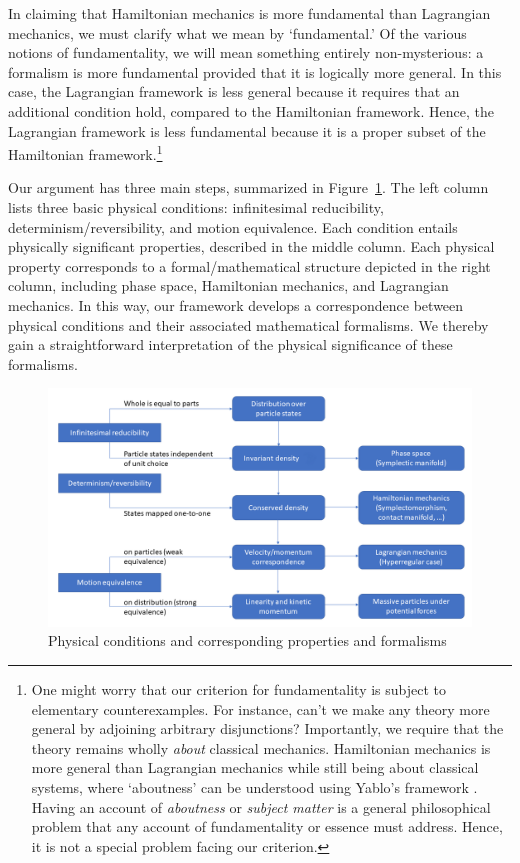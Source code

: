 \documentclass[12pt, english, twoside]{article} %
\begin{document}
In claiming that Hamiltonian mechanics is more fundamental than Lagrangian mechanics, we must clarify what we mean by `fundamental.' Of the various notions of fundamentality, we will mean something entirely non-mysterious: a formalism is more fundamental provided that it is logically more general. In this case, the Lagrangian framework is less general because it requires that an additional condition hold, compared to the Hamiltonian framework. Hence, the Lagrangian framework is less fundamental because it is a proper subset of the Hamiltonian framework.\footnote{One might worry that our criterion for fundamentality is subject to elementary counterexamples. For instance, can't we make any theory more general by adjoining arbitrary disjunctions? Importantly, we require that the theory remains wholly \textit{about} classical mechanics. Hamiltonian mechanics is more general than Lagrangian mechanics while still being about classical systems, where `aboutness' can be understood using Yablo's framework \parencites*[]{Yablo}. Having an account of \textit{aboutness} or \textit{subject matter} is a general philosophical problem that any account of fundamentality or essence must address. Hence, it is not a special problem facing our criterion.}

Our argument has three main steps, summarized in Figure~\ref{diagram}. The left column lists three basic physical conditions: infinitesimal reducibility, determinism/reversibility, and motion equivalence. Each condition entails physically significant properties, described in the middle column. Each physical property corresponds to a formal/mathematical structure depicted in the right column, including phase space, Hamiltonian mechanics, and Lagrangian mechanics. In this way, our framework develops a correspondence between physical conditions and their associated mathematical formalisms. We thereby gain a straightforward interpretation of the physical significance of these formalisms.

\begin{figure}[h]
	\centering
	\includegraphics[width=\textwidth]{Diagram.png}
\caption{Physical conditions and corresponding properties and formalisms}
\label{diagram}
\end{figure}
\end{document}
